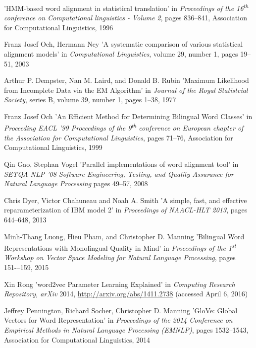 \begin{thebibliography}{99}
'HMM-based word alignment in statistical translation'
in \textit{Proceedings of the 16\textsuperscript{th} conference on Computational linguistics - Volume 2},
pages 836--841,
Association for Computational Linguistics,
1996

Franz Josef Och, Hermann Ney
'A systematic comparison of various statistical alignment models'
in \textit{Computational Linguistics},
volume 29, number 1,
pages 19--51,
2003

Arthur P. Dempster, Nan M. Laird, and Donald B. Rubin
'Maximum Likelihood from Incomplete Data via the EM Algorithm'
in \textit{Journal of the Royal Statistcial Society},
series B, volume 39, number 1,
pages 1--38,
1977

Franz Josef Och
'An Efficient Method for Determining Bilingual Word Classes'
in \textit{Proceeding EACL '99 Proceedings of the 9\textsuperscript{th} conference on European chapter of the Association for Computational Linguistics},
pages 71--76,
Association for Computational Linguistics,
1999

Qin Gao, Stephan Vogel
'Parallel implementations of word alignment tool'
in \textit{SETQA-NLP '08 Software Engineering, Testing, and Quality Assurance for Natural Language Processing}
pages 49--57,
2008

Chris Dyer, Victor Chahuneau and Noah A. Smith
'A simple, fast, and effective reparameterization of IBM model 2'
in \textit{Proceedings of NAACL-HLT 2013},
pages 644--648,
2013

Minh-Thang Luong, Hieu Pham, and Christopher D. Manning
'Bilingual Word Representations with Monolingual Quality in Mind'
in \textit{Proceedings of the 1\textsuperscript{st} Workshop on Vector Space Modeling	for Natural Language Processing},
pages 151-–159,
2015

Xin Rong
'word2vec Parameter Learning Explained'
in \textit{Computing Research Repository, arXiv}
2014,
\url{http://arxiv.org/abs/1411.2738} (accessed April 6, 2016)

Jeffrey Pennington, Richard Socher, Christopher D. Manning
'GloVe: Global Vectors for Word Representation'
in \textit{Proceedings of the 2014 Conference on Empirical Methods in Natural Language Processing (EMNLP)},
pages 1532--1543,
Association for Computational Linguistics,
2014


\end{thebibliography}

